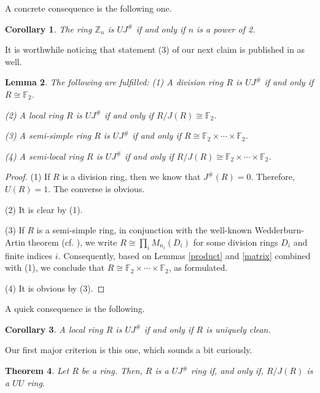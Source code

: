 \documentclass[12pt]{amsart}
\newtheorem{theorem}{Theorem}[section]
\newtheorem{lemma}[theorem]{Lemma}
\newtheorem{corollary}[theorem]{Corollary}
\theoremstyle{definition}
\begin{document}
A concrete consequence is the following one.

\begin{corollary}
The ring $\mathbb{Z}_n$ is $UJ^{\#}$ if and only if $n$ is a power of 2.
\end{corollary}

It is worthwhile noticing that statement (3) of our next claim is published in \cite{SU} as well.

\begin{lemma} The following are fulfilled:
(1) A division ring $R$ is $UJ^{\#}$ if and only if $R \cong \mathbb{F}_2$.

(2) A local ring $R$ is $UJ^{\#}$ if and only if $R/J(R) \cong \mathbb{F}_2$.

(3) A semi-simple ring $R$ is $UJ^{\#}$ if and only if $R \cong \mathbb{F}_2 \times \cdots \times \mathbb{F}_2$.

(4) A semi-local ring $R$ is $UJ^{\#}$ if and only if $R/J(R) \cong \mathbb{F}_2 \times \cdots \times \mathbb{F}_2$.
\end{lemma}

\begin{proof}
(1) If $R$ is a division ring, then we know that $J^{\#}(R)=0$. Therefore, $U(R)={1}$. The converse is obvious.

(2) It is clear by (1).

(3) If $R$ is a semi-simple ring, in conjunction with the well-known Wedderburn-Artin theorem (cf. \cite{lam}), we write $R\cong \prod_i M_{n_i}(D_i)$ for some division rings $D_i$ and finite indices $i$. Consequently, based on Lemmas \ref{product} and \ref{matrix} combined with (1), we conclude that $R \cong \mathbb{F}_2 \times \cdots \times \mathbb{F}_2$, as formulated.

(4) It is obvious by (3).
\end{proof}

A quick consequence is the following.

\begin{corollary}
A local ring $R$ is $UJ^{\#}$ if and only if $R$ is uniquely clean.
\end{corollary}

Our first major criterion is this one, which sounds a bit curiously.

\begin{theorem}\label{m}
Let $R$ be a ring. Then, $R$ is a $UJ^{\#}$ ring if, and only if, $R/J(R)$ is a $UU$ ring.
\end{theorem}
\end{document}
